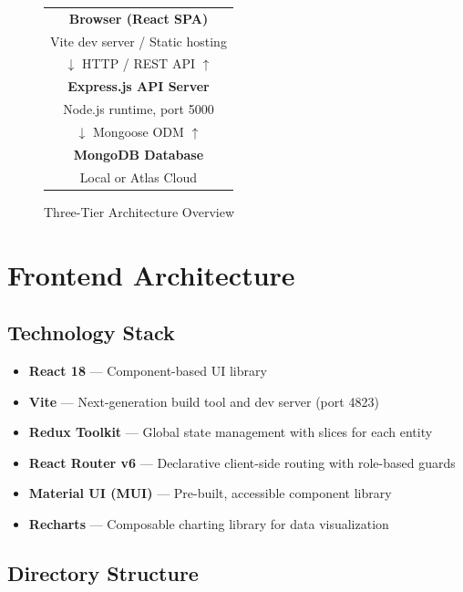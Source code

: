 \documentclass[12pt,a4paper]{report}
\begin{document}
\begin{figure}[h]
  \centering
  \begin{tabular}{|c|}
    \hline
    \textbf{Browser (React SPA)} \\
    Vite dev server / Static hosting \\
    \hline
    $\downarrow$ HTTP / REST API $\uparrow$ \\
    \hline
    \textbf{Express.js API Server} \\
    Node.js runtime, port 5000 \\
    \hline
    $\downarrow$ Mongoose ODM $\uparrow$ \\
    \hline
    \textbf{MongoDB Database} \\
    Local or Atlas Cloud \\
    \hline
  \end{tabular}
  \caption{Three-Tier Architecture Overview}
\end{figure}

\section{Frontend Architecture}

\subsection{Technology Stack}

\begin{itemize}[leftmargin=2em]
  \item \textbf{React 18} --- Component-based UI library
  \item \textbf{Vite} --- Next-generation build tool and dev server (port 4823)
  \item \textbf{Redux Toolkit} --- Global state management with slices for each entity
  \item \textbf{React Router v6} --- Declarative client-side routing with role-based guards
  \item \textbf{Material UI (MUI)} --- Pre-built, accessible component library
  \item \textbf{Recharts} --- Composable charting library for data visualization
\end{itemize}

\subsection{Directory Structure}
\end{document}

